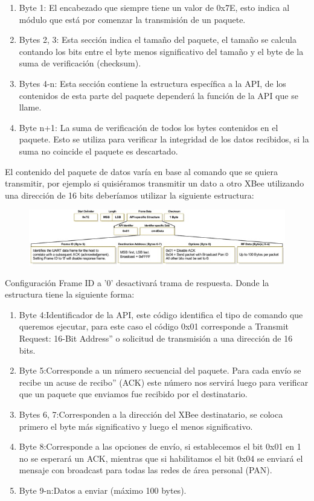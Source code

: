 \documentclass[11pt,oneside,spanish,a4paper]{article}
\begin{document}
\begin{enumerate}
\item Byte 1: El encabezado que siempre tiene un valor de 0x7E,
  esto indica al módulo que está por comenzar la transmisión de un
  paquete.
\item Bytes 2, 3: Esta sección indica el tamaño del paquete, el
  tamaño se calcula contando los bits entre el byte menos
  significativo del tamaño y el byte de la suma de verificación
  (checksum).
\item Bytes 4-n: Esta sección contiene la estructura específica a
  la API, de los contenidos de esta parte del paquete dependerá la
  función de la API que se llame.
\item Byte n+1: La suma de verificación de todos los bytes
  contenidos en el paquete. Esto se utiliza para verificar la
  integridad de los datos recibidos, si la suma no coincide el
  paquete es descartado.
\end{enumerate}

El contenido del paquete de datos varía en base al comando que se quiera transmitir, por ejemplo si quisiéramos transmitir un dato a otro XBee utilizando una dirección de 16 bits deberíamos utilizar la siguiente estructura:
\begin{figure}[ht]
	\centering
	\includegraphics[width=.6\textwidth]{img/IMAGEN06.jpg}
\end{figure}

Configuración Frame ID a '0' desactivará trama de respuesta.
Donde la estructura tiene la siguiente forma:
\begin{enumerate}
	\item Byte 4:Identificador de la API, este código identifica el
      tipo de comando que queremos ejecutar, para este caso el código
      0x01 corresponde a Transmit Request: 16-Bit Address'' o solicitud de transmisión a una dirección de 16 bits.
	\item Byte 5:Corresponde a un número secuencial del paquete. Para cada envío se recibe un acuse de recibo'' (ACK) este número nos servirá luego para verificar que un paquete que enviamos fue recibido por el destinatario.
	\item Bytes 6, 7:Corresponden a la dirección del XBee destinatario, se coloca primero el byte más significativo y luego el menos significativo.
	\item Byte 8:Corresponde a las opciones de envío, si establecemos el bit 0x01 en 1 no se esperará un ACK, mientras que si habilitamos el bit 0x04 se enviará el mensaje con broadcast para todas las redes de área personal (PAN).
	\item Byte 9-n:Datos a enviar (máximo 100 bytes).
\end{enumerate}
\end{document}
